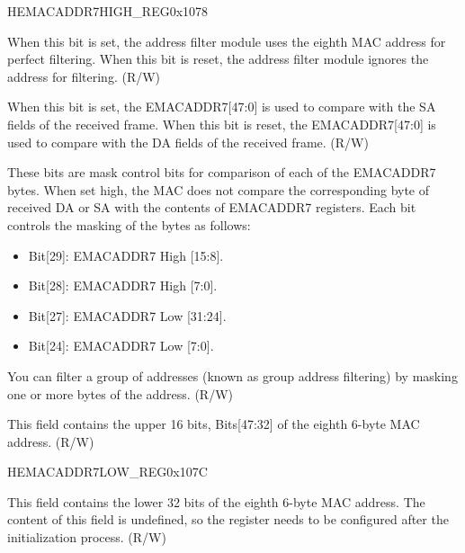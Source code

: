 \begin{register}{H}{EMACADDR7HIGH\_REG}{0x1078}\label{regdesc:EMACADDR7HIGHREG}
%
%
%
%
%
\regnewline%
\begin{regdesc}\begin{reglist}
\item [ADDRESS\_ENABLE7]When this bit is set, the address filter module uses the eighth MAC address  for perfect filtering. When this bit is reset, the address filter module ignores the address for filtering. (R/W)
\item [SOURCE\_ADDRESS7]When this bit is set, the EMACADDR7[47:0] is used to compare with the SA fields of the received frame. When this bit is reset, the EMACADDR7[47:0] is used to compare with the DA fields of the received frame. (R/W)
\item [MASK\_BYTE\_CONTROL7]These bits are mask control bits for comparison of each of the EMACADDR7 bytes. When set high, the MAC does not compare the corresponding byte of received DA or SA with the contents of EMACADDR7 registers. Each bit controls the masking of the bytes as follows: \begin{itemize}
\item Bit[29]: EMACADDR7 High [15:8]. \item Bit[28]: EMACADDR7 High [7:0]. \item Bit[27]: EMACADDR7 Low [31:24]. \item Bit[24]: EMACADDR7 Low [7:0].
\end{itemize} You can filter a group of addresses (known as group address filtering) by masking one or more bytes of the address. (R/W)
\item [MAC\_ADDRESS7\_HI]This field contains the upper 16 bits, Bits[47:32] of the eighth 6-byte MAC address. (R/W)
\end{reglist}\end{regdesc}
\end{register}

\begin{register}{H}{EMACADDR7LOW\_REG}{0x107C}\label{regdesc:EMACADDR7LOWREG}
%
\regnewline%
\begin{regdesc}\begin{reglist}
\item [EMACADDR7LOW\_REG]This field contains the lower 32 bits of the eighth 6-byte MAC address. The content of this field is undefined, so the register needs to be configured after the initialization process. (R/W)
\end{reglist}\end{regdesc}
\end{register}



